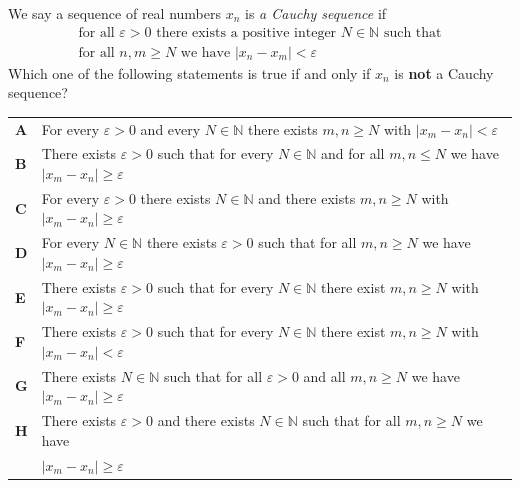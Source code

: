 \documentclass[11pt,a4paper]{article}
\begin{document}
\begin{enumerate}[label=\textbf{\arabic*.},leftmargin=*,itemsep=0pt,start=6]
\questionitem[Logic]
We say a sequence of real numbers $x_n$ is \textit{a Cauchy sequence} if
\[
\begin{array}{c}
\text{for all $\varepsilon>0$ there exists a positive integer $N \in\mathbb{N}$ such that} \\[2pt]
\text{for all $n,m \geq N$ we have $|x_n - x_m | < \varepsilon$}
\end{array}
\]
Which one of the following statements is true if and only if $x_n$ is \textbf{not} a Cauchy sequence?

\par\vspace*{12pt}
\begin{tabularx}{\linewidth}{@{}>{\bfseries}l Y@{}}
A &
For every $\varepsilon>0$ and every $N\in\mathbb{N}$ there exists $m,n\ge N$ with $|x_m-x_n|<\varepsilon$
\\[0.8em]
B &
There exists $\varepsilon>0$ such that for every $N\in\mathbb{N}$ and for all $m,n\le N$ we have $|x_m-x_n|\ge \varepsilon$
\\[0.8em]
C &
For every $\varepsilon>0$ there exists $N\in\mathbb{N}$ and there exists $m,n\ge N$ with $|x_m-x_n|\ge \varepsilon$
\\[0.8em]
D &
For every $N\in\mathbb{N}$ there exists $\varepsilon>0$ such that for all $m,n\ge N$ we have $|x_m-x_n|\ge \varepsilon$
\\[0.8em]
E &
There exists $\varepsilon>0$ such that for every $N\in\mathbb{N}$ there exist $m,n\ge N$ with $|x_m-x_n|\ge \varepsilon$
\\[0.8em]
F &
There exists $\varepsilon>0$ such that for every $N\in\mathbb{N}$ there exist $m,n\ge N$ with $|x_m-x_n|<\varepsilon$
\\[0.8em]
G &
There exists $N\in\mathbb{N}$ such that for all $\varepsilon>0$ and all $m,n\ge N$ we have $|x_m-x_n|\ge \varepsilon$
\\[0.8em]
H &
There exists $\varepsilon>0$ and there exists $N\in\mathbb{N}$ such that for all $m,n\ge N$ we have \\&$|x_m-x_n|\ge \varepsilon$
\\
\end{tabularx}
\end{enumerate}
\end{document}
